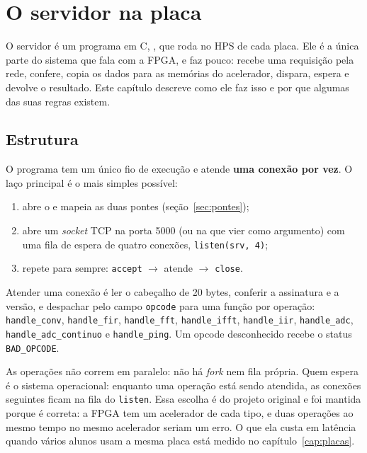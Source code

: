 \chapter{O servidor na placa}
\label{cap:servidor}

O servidor é um programa em C, , que roda no HPS de cada
placa. Ele é a única parte do sistema que fala com a FPGA, e faz pouco: recebe
uma requisição pela rede, confere, copia os dados para as memórias do
acelerador, dispara, espera e devolve o resultado. Este capítulo descreve como
ele faz isso e por que algumas das suas regras existem.

\section{Estrutura}

O programa tem um único fio de execução e atende \textbf{uma conexão por vez}.
O laço principal é o mais simples possível:

\begin{enumerate}
  \item abre o  e mapeia as duas pontes (seção~\ref{sec:pontes});
  \item abre um \emph{socket} TCP na porta 5000 (ou na que vier como argumento)
    com uma fila de espera de quatro conexões, \texttt{listen(srv, 4)};
  \item repete para sempre: \texttt{accept} \(\to\) atende \(\to\)
    \texttt{close}.
\end{enumerate}

Atender uma conexão é ler o cabeçalho de 20 bytes, conferir a assinatura e a
versão, e despachar pelo campo \texttt{opcode} para uma função por operação:
\texttt{handle\_conv}, \texttt{handle\_fir}, \texttt{handle\_fft},
\texttt{handle\_ifft}, \texttt{handle\_iir}, \texttt{handle\_adc},
\texttt{handle\_adc\_continuo} e \texttt{handle\_ping}. Um opcode desconhecido
recebe o status \texttt{BAD\_OPCODE}.

As operações não correm em paralelo: não há \emph{fork} nem fila própria. Quem
espera é o sistema operacional: enquanto uma operação está sendo atendida, as
conexões seguintes ficam na fila do \texttt{listen}. Essa escolha é do projeto
original e foi mantida porque é correta: a FPGA tem um acelerador de cada tipo,
e duas operações ao mesmo tempo no mesmo acelerador seriam um erro. O que ela
custa em latência quando vários alunos usam a mesma placa está medido no
capítulo~\ref{cap:placas}.

